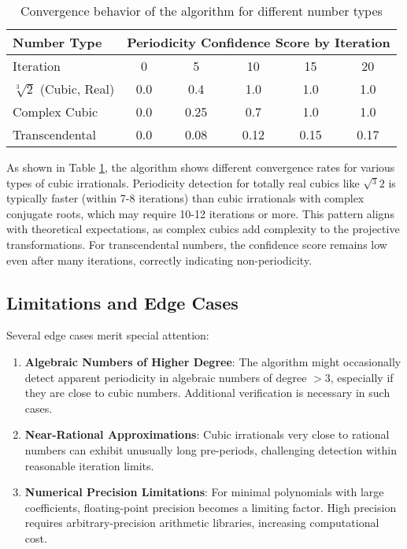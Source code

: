 \begin{table}[htbp]
\centering
\begin{tabular}{|l|c|c|c|c|c|}
\hline
\textbf{Number Type} & \multicolumn{5}{c|}{\textbf{Periodicity Confidence Score by Iteration}} \\
\hline
Iteration & 0 & 5 & 10 & 15 & 20 \\
\hline
$\sqrt[3]{2}$ (Cubic, Real) & 0.0 & 0.4 & 1.0 & 1.0 & 1.0 \\
\hline
Complex Cubic & 0.0 & 0.25 & 0.7 & 1.0 & 1.0 \\
\hline
Transcendental & 0.0 & 0.08 & 0.12 & 0.15 & 0.17 \\
\hline
\end{tabular}
\caption{Convergence behavior of the \HAPD{} algorithm for different number types}
\label{fig:algorithmic_convergence}
\end{table}

As shown in Table \ref{fig:algorithmic_convergence}, the \HAPD{} algorithm shows different convergence rates for various types of cubic irrationals. Periodicity detection for totally real cubics like $\sqrt{^3}{2}$ is typically faster (within 7-8 iterations) than cubic irrationals with complex conjugate roots, which may require 10-12 iterations or more. This pattern aligns with theoretical expectations, as complex cubics add complexity to the projective transformations. For transcendental numbers, the confidence score remains low even after many iterations, correctly indicating non-periodicity.

\subsection{Limitations and Edge Cases}

Several edge cases merit special attention:

\begin{enumerate}
\item \textbf{Algebraic Numbers of Higher Degree}: The algorithm might occasionally detect apparent periodicity in algebraic numbers of degree $> 3$, especially if they are close to cubic numbers. Additional verification is necessary in such cases.

\item \textbf{Near-Rational Approximations}: Cubic irrationals very close to rational numbers can exhibit unusually long pre-periods, challenging detection within reasonable iteration limits.

\item \textbf{Numerical Precision Limitations}: For minimal polynomials with large coefficients, floating-point precision becomes a limiting factor. High precision requires arbitrary-precision arithmetic libraries, increasing computational cost.
\end{enumerate}

